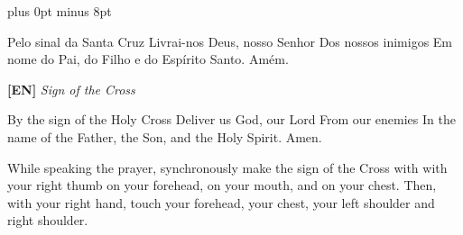 %
\setcounter{songnum}{1}

\renewcommand{\thesongnum}{\Roman{songnum}}
\chordsoff
\versesep 30pt plus 0pt minus 8pt

\newcommand{\translationtitle}[2]{
  \textbf{[#1]} \textit{#2}\vspace{1.618034ex}
}
\newcommand{\parspace}{\vspace{1ex}}

\newenvironment{note}{%
  \yesendsongvfill%
  \vfill%
  \beginverse*%
  \small%
  \begin{itshape}%
}{%
  \end{itshape}%
  \endverse%
}


  \beginverse
    Pelo sinal da Santa Cruz
    Livrai-nos Deus, nosso Senhor
    Dos nossos inimigos
    \parspace
    Em nome do Pai,
    do Filho e
    do Espírito Santo.
    \parspace
    Amém.
  \endverse
  \beginverse
    \translationtitle{EN}{Sign of the Cross}
    By the sign of the Holy Cross
    Deliver us God, our Lord
    From our enemies
    \parspace
    In the name of the Father,
    the Son, and
    the Holy Spirit.
    \parspace
    Amen.
  \endverse
  \begin{note}
    While speaking the prayer, synchronously make
    the sign of the Cross with with your right thumb
    on your forehead,
    on your mouth, and
    on your chest.
    \parspace
    Then, with your right hand, touch
    your forehead,
    your chest,
    your left shoulder and right shoulder.
  \end{note}
\endsong


